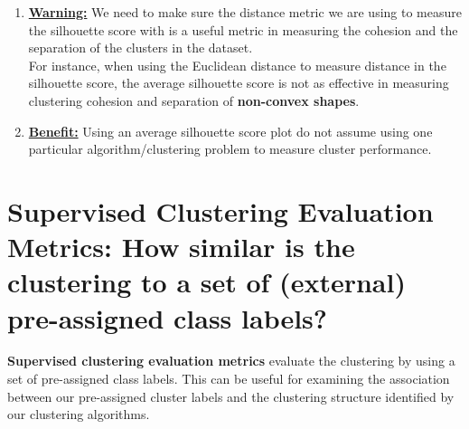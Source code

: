 \documentclass[11pt]{elegantbook}
\begin{document}
\begin{enumerate}[(1).]
    \item \textbf{\underline{Warning:}} We need to make sure the distance metric we are using to measure the silhouette score with is a useful metric in measuring the cohesion and the separation of
    the clusters in the dataset.\\
    For instance, when using the Euclidean distance to measure distance in the silhouette score, the average silhouette score is not as effective in measuring clustering cohesion and separation of \textbf{non-convex shapes}.
    \item \textbf{\underline{Benefit:}} Using an average silhouette score plot do not assume using one particular algorithm/clustering problem to measure cluster performance.
\end{enumerate}




\section{Supervised Clustering Evaluation Metrics: How similar is the clustering to a set of (external) pre-assigned class labels?}

\begin{definition}
    \textbf{Supervised clustering evaluation metrics} evaluate the clustering by using a set of pre-assigned class labels. This can be useful for examining the association between our pre-assigned cluster labels and the clustering structure identified by our clustering algorithms.
\end{definition}
\end{document}
